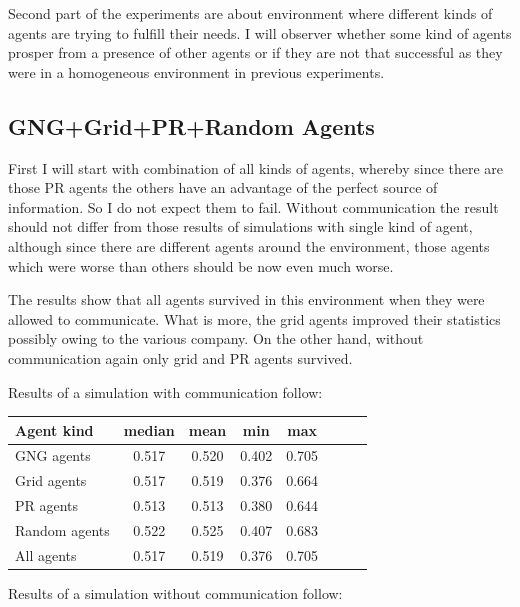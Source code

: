 Second part of the experiments are about environment where different kinds of agents are trying to fulfill their needs. I will observer whether some kind of agents prosper from a presence of other agents or if they are not that successful as they were in a homogeneous environment in previous experiments.
                                                                                
\subsection{GNG+Grid+PR+Random Agents}

First I will start with combination of all kinds of agents, whereby since there are those PR agents the others have an advantage of the perfect source of information. So I do not expect them to fail. Without communication the result should not differ from those results of simulations with single kind of agent, although since there are different agents around the environment, those agents which were worse than others should be now even much worse.

The results show that all agents survived in this environment when they were allowed to communicate. What is more, the grid agents improved their statistics possibly owing to the various company. On the other hand, without communication again only grid and PR agents survived. 

Results of a simulation with communication follow:

\begin{center}   
  \begin{tabular}{l*{6}{c}r}
  Agent kind        & median & mean & min & max \\
  \hline
  GNG agents        & 0.517 & 0.520 & 0.402 & 0.705  \\
  Grid agents       & 0.517 & 0.519 & 0.376 & 0.664  \\   
  PR agents         & 0.513 & 0.513 & 0.380 & 0.644 \\  
  Random agents     & 0.522 & 0.525 & 0.407 & 0.683  \\
  All agents        & 0.517 & 0.519 & 0.376 & 0.705  \\ 
  \end{tabular}                  
\end{center}
       
Results of a simulation without communication follow:
              
